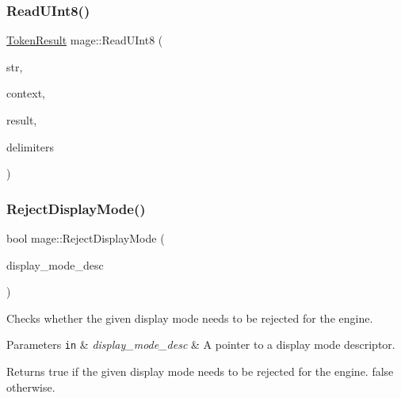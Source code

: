 \hypertarget{namespacemage_a357352c06cab6568efee62ddc9dcc6c9}{}\label{namespacemage_a357352c06cab6568efee62ddc9dcc6c9} 
\subsubsection{\texorpdfstring{Read\+U\+Int8()}{ReadUInt8()}}
{\footnotesize\ttfamily \hyperlink{namespacemage_a2178ba2411db5912f41b2e7698c2037d}{Token\+Result} mage\+::\+Read\+U\+Int8 (\begin{DoxyParamCaption}\item[{char $\ast$}]{str,  }\item[{char $\ast$$\ast$}]{context,  }\item[{uint8\+\_\+t \&}]{result,  }\item[{const char $\ast$}]{delimiters }\end{DoxyParamCaption})}

\hypertarget{namespacemage_abdccde1f16aa2239019e1b455d8b941b}{}\label{namespacemage_abdccde1f16aa2239019e1b455d8b941b} 
\subsubsection{\texorpdfstring{Reject\+Display\+Mode()}{RejectDisplayMode()}}
{\footnotesize\ttfamily bool mage\+::\+Reject\+Display\+Mode (\begin{DoxyParamCaption}\item[{const D\+X\+G\+I\+\_\+\+M\+O\+D\+E\+\_\+\+D\+E\+S\+C1 $\ast$}]{display\+\_\+mode\+\_\+desc }\end{DoxyParamCaption})}

Checks whether the given display mode needs to be rejected for the engine.


\begin{DoxyParams}[1]{Parameters}
\mbox{\tt in}  & {\em display\+\_\+mode\+\_\+desc} & A pointer to a display mode descriptor. \\
\hline
\end{DoxyParams}
\begin{DoxyReturn}{Returns}
{\ttfamily true} if the given display mode needs to be rejected for the engine. {\ttfamily false} otherwise. 
\end{DoxyReturn}
\hypertarget{namespacemage_a56c8c38aee820faf885024ed22e70a8e}{}\label{namespacemage_a56c8c38aee820faf885024ed22e70a8e} 
